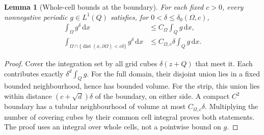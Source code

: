 \documentclass[11pt,a4paper]{article}
\numberwithin{equation}{section}
\newtheorem{lemma}[theorem]{Lemma}
\theoremstyle{definition}
\theoremstyle{remark}\newtheorem{remark}[theorem]{Remark}
\DeclareMathOperator{\dist}{dist}
\newcommand{\dd}{\,\mathrm dx}
\begin{document}
\begin{lemma}[Whole-cell bounds at the boundary]\label{lem:boundary-cells}
For each fixed \(c>0\), every nonnegative periodic \(g\in L^1(Q)\)
satisfies, for \(0<\delta\leq\delta_0(\Omega,c)\),
\begin{align}
 \int_\Omega g^\delta\dd&\leq C_\Omega\int_Qg\dd,
                                      \label{eq:full-cell-cover}\\
 \int_{\Omega\cap\{\dist(x,\partial\Omega)<c\delta\}}g^\delta\dd
 &\leq C_{\Omega,c}\delta\int_Qg\dd. \label{eq:strip-cell-cover}
\end{align}
\end{lemma}
\begin{proof}
Cover the integration set by all grid cubes \(\delta(z+Q)\)
that meet it. Each contributes exactly \(\delta^d\int_Qg\).
For the full domain, their disjoint union lies in a fixed bounded
neighbourhood, hence has bounded volume. For the strip, this
union lies within distance \((c+\sqrt d)\delta\) of the boundary,
on either side. A compact \(C^2\) boundary has a tubular
neighbourhood of volume at most \(C_{\Omega,c}\delta\).
Multiplying the number of covering cubes by their common cell
integral proves both statements. The proof uses an integral
over whole cells, not a pointwise bound on \(g\).
\end{proof}
\end{document}
